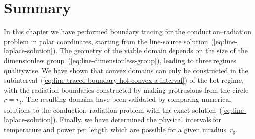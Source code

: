 \section{Summary}
\label{sec:polar.summary}

In this chapter we have performed boundary tracing
for the conduction--radiation problem in polar coordinates,
starting from the line-source solution~(\ref{eq:line-laplace-solution}).
The geometry of the viable domain depends on the size
of the dimensionless group~(\ref{eq:line-dimensionless-group}),
leading to three regimes qualitywise.
We have shown that convex domains can only be constructed
in the subinterval~(\ref{eq:line-traced-boundary-hot-convex-a-interval})
of the hot regime,
with the radiation boundaries constructed by
making protrusions from the circle~$r = r_\sharp$.
The resulting domains have been validated
by comparing numerical solutions to the conduction--radiation problem
with the exact solution~(\ref{eq:line-laplace-solution}).
Finally, we have determined the physical intervals
for temperature and power per length
which are possible for a given inradius~$r_\sharp$.
